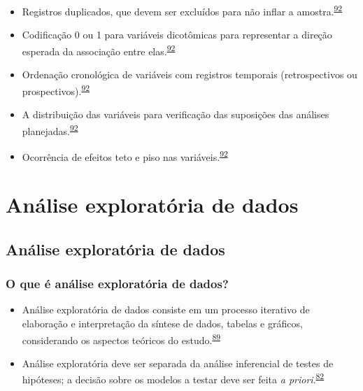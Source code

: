 \documentclass[
  a4paper,
]{book}
\begin{document}
\begin{itemize}
\item
  Registros duplicados, que devem ser excluídos para não inflar a amostra.\textsuperscript{\protect\hyperlink{ref-huebner2016}{92}}
\item
  Codificação 0 ou 1 para variáveis dicotômicas para representar a direção esperada da associação entre elas.\textsuperscript{\protect\hyperlink{ref-huebner2016}{92}}
\item
  Ordenação cronológica de variáveis com registros temporais (retrospectivos ou prospectivos).\textsuperscript{\protect\hyperlink{ref-huebner2016}{92}}
\item
  A distribuição das variáveis para verificação das suposições das análises planejadas.\textsuperscript{\protect\hyperlink{ref-huebner2016}{92}}
\item
  Ocorrência de efeitos teto e piso nas variáveis.\textsuperscript{\protect\hyperlink{ref-huebner2016}{92}}
\end{itemize}

\hypertarget{analise-exploratoria-dados}{%
\chapter{\texorpdfstring{\textbf{Análise exploratória de dados}}{Análise exploratória de dados}}\label{analise-exploratoria-dados}}

\hypertarget{analise-exploratoria}{%
\section{Análise exploratória de dados}\label{analise-exploratoria}}

\hypertarget{o-que-uxe9-anuxe1lise-exploratuxf3ria-de-dados}{%
\subsection{O que é análise exploratória de dados?}\label{o-que-uxe9-anuxe1lise-exploratuxf3ria-de-dados}}

\begin{itemize}
\item
  Análise exploratória de dados consiste em um processo iterativo de elaboração e interpretação da síntese de dados, tabelas e gráficos, considerando os aspectos teóricos do estudo.\textsuperscript{\protect\hyperlink{ref-Ferketich1986}{89}}
\item
  Análise exploratória deve ser separada da análise inferencial de testes de hipóteses; a decisão sobre os modelos a testar deve ser feita \emph{a priori}.\textsuperscript{\protect\hyperlink{ref-zuur2009}{82}}
\end{itemize}
\end{document}
